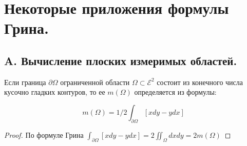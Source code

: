 \section{Некоторые приложения формулы Грина.} 
\subsection*{A. Вычисление плоских измеримых областей.} 
\begin{sentence} Если граница $\partial \Omega$ ограниченной области $\Omega\subset \mathscr{E}^2$ состоит из конечного числа кусочно гладких контуров, то ее $m(\Omega)$ определяется из формулы:
\end{sentence}
\begin{equation*}
m(\Omega)=1/2\int_{\partial\Omega}\left[xdy-ydx\right]
\end{equation*} 
\begin{proof} По формуле Грина $\int_{\partial\Omega}\left[xdy-ydx\right]=2\iint_\Omega dxdy=2m(\Omega)$
\end{proof}
